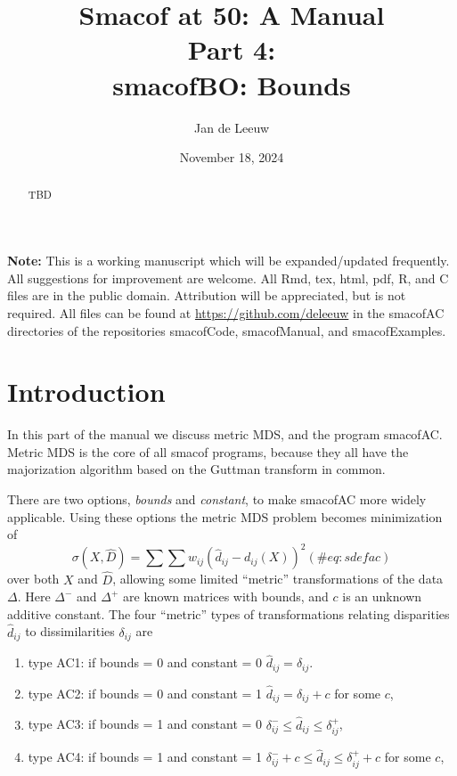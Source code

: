 \documentclass[
  12pt,
  letterpaper,
  DIV=11,
  numbers=noendperiod]{scrartcl}
\title{Smacof at 50: A Manual\\
Part 4:\\
smacofBO: Bounds}
\author{Jan de Leeuw}
\date{November 18, 2024}
\providecommand{\tightlist}{%
  \setlength{\itemsep}{0pt}\setlength{\parskip}{0pt}}\usepackage{longtable,booktabs,array}
\renewcommand*\contentsname{Table of contents}
\newcommand\contentsname{Table of contents}
\begin{document}
\maketitle
\begin{abstract}
TBD
\end{abstract}

\renewcommand*\contentsname{Table of contents}
{
\hypersetup{linkcolor=}
\setcounter{tocdepth}{3}
\tableofcontents
}

\textbf{Note:} This is a working manuscript which will be
expanded/updated frequently. All suggestions for improvement are
welcome. All Rmd, tex, html, pdf, R, and C files are in the public
domain. Attribution will be appreciated, but is not required. All files
can be found at \url{https://github.com/deleeuw} in the smacofAC
directories of the repositories smacofCode, smacofManual, and
smacofExamples.

\section{Introduction}\label{introduction}

In this part of the manual we discuss metric MDS, and the program
smacofAC. Metric MDS is the core of all smacof programs, because they
all have the majorization algorithm based on the Guttman transform in
common.

There are two options, \emph{bounds} and \emph{constant}, to make
smacofAC more widely applicable. Using these options the metric MDS
problem becomes minimization of \begin{equation}
\sigma(X,\hat D)=\sum\sum w_{ij}(\hat d_{ij}-d_{ij}(X))^2
(\#eq:sdefac)
\end{equation} over both \(X\) and \(\hat D\), allowing some limited
``metric'' transformations of the data \(\Delta\). Here \(\Delta^-\) and
\(\Delta^+\) are known matrices with bounds, and \(c\) is an unknown
additive constant. The four ``metric'' types of transformations relating
disparities \(\hat d_{ij}\) to dissimilarities \(\delta_{ij}\) are

\begin{enumerate}
\def\labelenumi{\arabic{enumi}.}
\tightlist
\item
  type AC1: if bounds = 0 and constant = 0 \(\hat d_{ij}=\delta_{ij}\).
\item
  type AC2: if bounds = 0 and constant = 1 \(\hat d_{ij}=\delta_{ij}+c\)
  for some \(c\),
\item
  type AC3: if bounds = 1 and constant = 0
  \(\delta^-_{ij}\leq\hat d_{ij}\leq\delta^+_{ij}\),
\item
  type AC4: if bounds = 1 and constant = 1
  \(\delta^-_{ij}+c\leq\hat d_{ij}\leq\delta^+_{ij}+c\) for some \(c\),
\end{enumerate}
\end{document}
